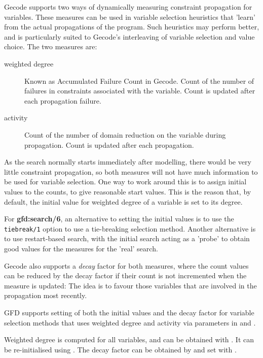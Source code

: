 Gecode supports two ways of dynamically measuring constraint propagation for
variables. These measures can be used in variable selection heuristics 
that  'learn' from the actual propagations of the program. Such
heuristics may perform better, and is particularly suited to Gecode's
interleaving of variable selection and value choice. The two measures are:
\begin{description}
\item[weighted degree] Known as Accumulated Failure Count in Gecode. 
Count of the number of failures in
constraints associated with the variable. Count is updated after each
propagation failure.
\item[activity] Count of the number of domain
reduction on the variable during propagation. Count is updated after each
propagation.
\end{description}

As the search normally starts immediately after modelling, there would be
very little constraint propagation, so both measures
will not have much information to be used for variable selection.
One way to work around this is to assign initial
values to the counts, to give reasonable start values. This is the reason
that, by default, the initial value for weighted degree of a variable is set
to its degree. 

For {\bf gfd:search/6}, an alternative to setting the initial values is to
use the \texttt{tiebreak/1} option to use a tie-breaking
selection method. Another alternative is to use restart-based search, with
the initial search acting as a 'probe' to obtain good values for the measures
for the 'real' search.

Gecode also supports a {\it decay\/} factor for both measures, where the
count values can be reduced by the decay factor if their count is not 
incremented when the measure is updated: The idea is to favour those 
variables that are involved in the propagation most recently. 

GFD supports setting of both the initial values and the decay factor for
variable selection methods that uses weighted
degree and activity via parameters in
 and
. 

\begin{sloppypar}
Weighted degree is computed for all variables, and can be obtained with
. It can be re-initialised using 
. The decay factor can be obtained by
 and set with 
.
\end{sloppypar}

